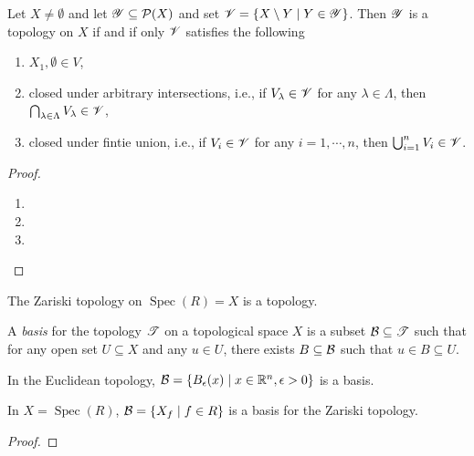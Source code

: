 \begin{proposition}
    Let $X \neq \emptyset$ and let $\mathscr{Y} \subseteq \mathcal{P}(X)$ and set $\mathscr{V} = \{X \setminus Y \mid Y \in \mathscr{Y}\}$. Then $\mathscr{Y}$ is a topology on $X$ if and if only $\mathscr{V}$ satisfies the following
    \begin{enumerate}
        \item $X_1,\emptyset \in V$,
        \item closed under arbitrary intersections, i.e., if $V_\lambda \in \mathscr{V}$ for any $\lambda \in \Lambda$, then $\bigcap_{\lambda \in \Lambda} V_\lambda \in \mathscr{V}$,
        \item closed under fintie union, i.e., if $V_i \in \mathscr{V}$ for any $i = 1,\cdots,n$, then $\bigcup_{i=1}^n V_i \in \mathscr{V}$.
    \end{enumerate}
\end{proposition}

\begin{proof}
    \begin{enumerate}
        \item 
        \item 
        \item 
    \end{enumerate}
\end{proof}

\begin{theorem}
    The Zariski topology on $\operatorname{Spec}(R) = X$ is a topology.
\end{theorem}

\begin{definition}
    A \emph{basis} for the topology $\mathscr{T}$ on a topological space $X$ is a subset $\mathcal{B} \subseteq \mathscr{T}$ such that for any open set $U \subseteq X$ and any $u \in U$, there exists $B \subseteq \mathcal{B}$ such that $u \in B \subseteq U$.
\end{definition}

\begin{example}
    In the Euclidean topology, $\mathcal{B} = \{B_\epsilon(x) \mid x \in \mathbb{R}^n, \epsilon > 0\}$ is a basis.
\end{example}

\begin{theorem}
    In $X = \operatorname{Spec}(R)$, $\mathcal{B} = \{X_f \mid f \in R\}$ is a basis for the Zariski topology.
\end{theorem}

\begin{proof}

\end{proof}

